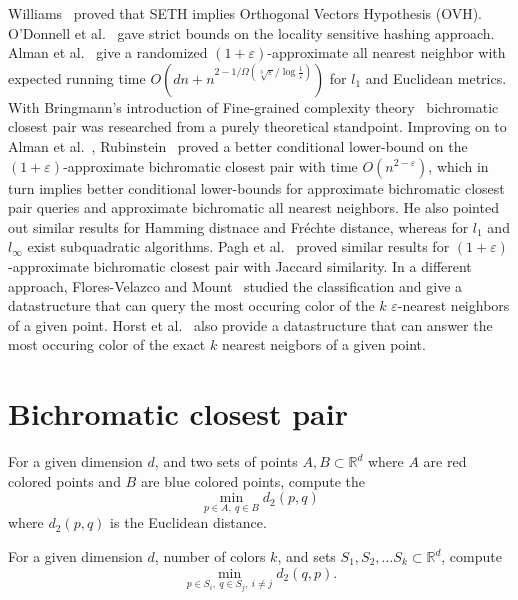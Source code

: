 \documentclass[a4paper,UKenglish,cleveref, autoref, thm-restate]{lipics-v2021}
\begin{document}
Williams~\cite{Williams2005} proved that SETH implies Orthogonal Vectors Hypothesis (OVH).
O'Donnell et al.~\cite{ODonnell2009} gave strict bounds on the locality sensitive hashing approach.
Alman et al.~\cite{Alman2016} give a randomized $(1+\varepsilon)$-approximate all nearest neighbor with expected running time $O(dn + n^{2 - 1/\Omega(\sqrt[3]{\varepsilon}/\log \frac{1}{\varepsilon})})$ for $l_1$ and Euclidean metrics.
With Bringmann's introduction of Fine-grained complexity theory~\cite{Bringmann2019,Bringmann2021} bichromatic closest pair was researched from a purely theoretical standpoint.
Improving on to Alman et al.~\cite{Alman2016}, Rubinstein~\cite{Rubinstein2018} proved a better conditional lower-bound on the $(1+\varepsilon)$-approximate bichromatic closest pair with time $O(n^{2-\varepsilon})$, which in turn implies better conditional lower-bounds for approximate bichromatic closest pair queries and approximate bichromatic all nearest neighbors.
He also pointed out similar results for Hamming distnace and Fr\'{e}chte distance, whereas for $l_1$ and $l_\infty$ exist subquadratic algorithms.
Pagh et al.~\cite{Pagh2019} proved similar results for $(1+\varepsilon)$-approximate bichromatic closest pair with Jaccard similarity.
In a different approach, Flores-Velazco and Mount~\cite{FloresVelazco2021} studied the classification and give a datastructure that can query the most occuring color of the $k$ $\varepsilon$-nearest neighbors of a given point.
Horst et al.~\cite{Horst2022} also provide a datastructure that can answer the most occuring color of the exact $k$ nearest neigbors of a given point.


\section{Bichromatic closest pair}

\begin{definition}
For a given dimension $d$, and two sets of points $A, B \subset \mathbb{R}^d$ where $A$ are red colored points and $B$ are blue colored points, compute the
$$ \min \limits_{p \in A,\ q\in B} d_2(p, q) $$
where $d_2(p, q)$ is the Euclidean distance.
\end{definition}

\begin{definition}
For a given dimension $d$, number of colors $k$, and sets $S_1, S_2, \dots S_k \subset \mathbb{R}^d$,
compute
$$ \min \limits_{p \in S_i,\ q \in S_j,\ i \neq j} d_2(q, p). $$

\end{definition}
\end{document}
